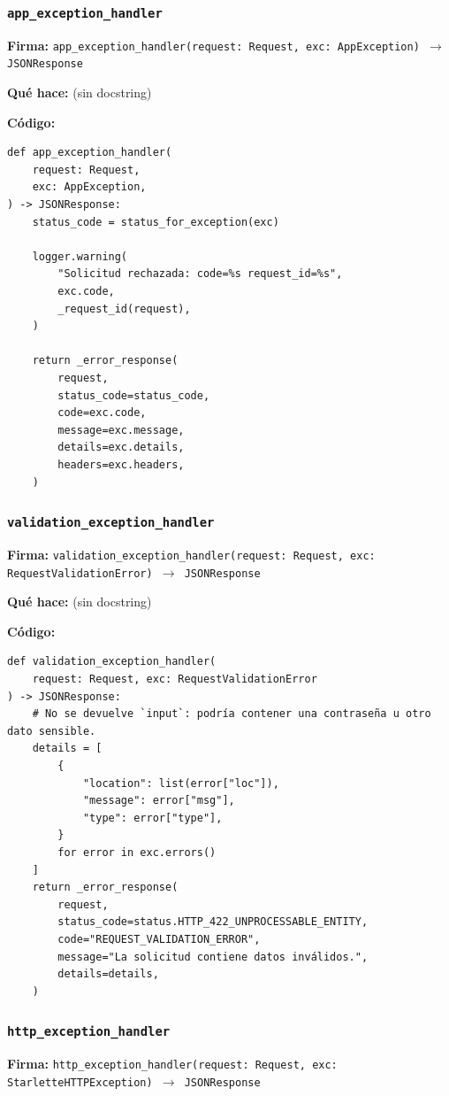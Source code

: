 \documentclass[11pt,a4paper]{article}
\begin{document}
\subsubsection*{\texttt{app\_exception\_handler}}
\textbf{Firma:} \texttt{app\_exception\_handler(request: Request, exc: AppException) $\rightarrow$ JSONResponse}

\textbf{Qué hace:} (sin docstring)

\textbf{Código:}
\begin{lstlisting}
def app_exception_handler(
    request: Request,
    exc: AppException,
) -> JSONResponse:
    status_code = status_for_exception(exc)

    logger.warning(
        "Solicitud rechazada: code=%s request_id=%s",
        exc.code,
        _request_id(request),
    )

    return _error_response(
        request,
        status_code=status_code,
        code=exc.code,
        message=exc.message,
        details=exc.details,
        headers=exc.headers,
    )
\end{lstlisting}

\subsubsection*{\texttt{validation\_exception\_handler}}
\textbf{Firma:} \texttt{validation\_exception\_handler(request: Request, exc: RequestValidationError) $\rightarrow$ JSONResponse}

\textbf{Qué hace:} (sin docstring)

\textbf{Código:}
\begin{lstlisting}
def validation_exception_handler(
    request: Request, exc: RequestValidationError
) -> JSONResponse:
    # No se devuelve `input`: podría contener una contraseña u otro dato sensible.
    details = [
        {
            "location": list(error["loc"]),
            "message": error["msg"],
            "type": error["type"],
        }
        for error in exc.errors()
    ]
    return _error_response(
        request,
        status_code=status.HTTP_422_UNPROCESSABLE_ENTITY,
        code="REQUEST_VALIDATION_ERROR",
        message="La solicitud contiene datos inválidos.",
        details=details,
    )
\end{lstlisting}

\subsubsection*{\texttt{http\_exception\_handler}}
\textbf{Firma:} \texttt{http\_exception\_handler(request: Request, exc: StarletteHTTPException) $\rightarrow$ JSONResponse}
\end{document}
